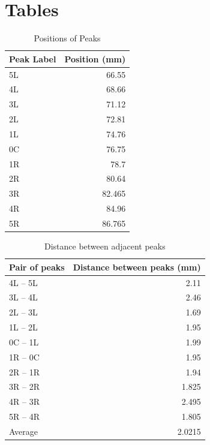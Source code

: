 \section{Tables}
\begin{table}[ht!]
	\centering
	\begin{tabular}{|l|r|} \hline
		Peak Label & Position (mm) \\
		\hline
		5L & 66.55 \\
		4L & 68.66 \\
		3L & 71.12 \\
		2L & 72.81 \\
		1L & 74.76 \\
		0C & 76.75 \\
		1R & 78.7 \\
		2R & 80.64 \\
		3R & 82.465 \\
		4R & 84.96 \\
		5R & 86.765 \\
		\hline
	\end{tabular}
	\caption{Positions of Peaks}
	\label{table.10.pos}
\end{table}
\begin{table}[ht!]
	\centering
	\begin{tabular}{|l|r|} \hline
		Pair of peaks & Distance between peaks (mm) \\
		\hline
		4L -- 5L & 2.11 \\
		3L -- 4L & 2.46 \\
		2L -- 3L & 1.69 \\
		1L -- 2L & 1.95 \\
		0C -- 1L & 1.99 \\
		1R -- 0C & 1.95 \\
		2R -- 1R & 1.94 \\
		3R -- 2R & 1.825 \\
		4R -- 3R & 2.495 \\
		5R -- 4R & 1.805 \\
		\hline
		Average & 2.0215 \\
		\hline
	\end{tabular}
	\caption{Distance between adjacent peaks}
	\label{table.10.disA}
\end{table}
\newpage
